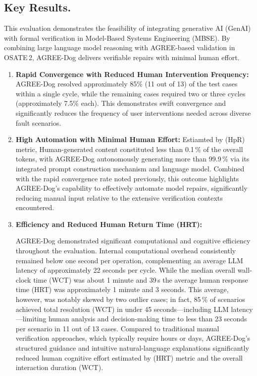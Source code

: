 \subsection{Key Results.}
This evaluation demonstrates the feasibility of integrating generative AI (GenAI) with formal verification in Model-Based Systems Engineering (MBSE). By combining large language model reasoning with AGREE-based validation in OSATE\,2, AGREE-Dog delivers verifiable repairs with minimal human effort. %

\begin{enumerate}
%
\item \textbf{Rapid Convergence with Reduced Human Intervention Frequency:}
AGREE-Dog resolved approximately 85\% (11 out of 13) of the test cases within a single cycle, while the remaining cases required two or three cycles (approximately 7.5\% each). This demonstrates swift convergence and significantly reduces the frequency of user interventions needed across diverse fault scenarios.

\item \textbf{High Automation with Minimal Human Effort:}
Estiamted by (HpR) metric, Human-generated content constituted less than 0.1\,\% of the overall tokens, with AGREE-Dog autonomously generating more than 99.9\,\% via its integrated prompt construction mechanism and language model. Combined with the rapid convergence rate noted previously, this outcome highlights AGREE-Dog’s capability to effectively automate model repairs, significantly reducing manual input relative to the extensive verification contexts encountered.

\item \textbf{Efficiency and Reduced Human Return Time (HRT):}

AGREE-Dog demonstrated significant computational and cognitive efficiency throughout the evaluation. Internal computational overhead consistently remained below one second per operation, complementing an average LLM latency of approximately 22 seconds per cycle. While the median overall wall-clock time (WCT) was about 1 minute and 39\,s the average human response time (HRT) was approximately 1 minute and 3 seconds. This average, however, was notably skewed by two outlier cases; in fact, 85\,\% of scenarios achieved total resolution (WCT) in under 45 seconds—including LLM latency—limiting human analysis and decision-making time to less than 23 seconds per scenario in 11 out of 13 cases. Compared to traditional manual verification approaches, which typically require hours or days, AGREE-Dog’s structured guidance and intuitive natural-language explanations significantly reduced human cognitive effort estimated by (HRT) metric and the overall interaction duration (WCT). %
\end{enumerate}

